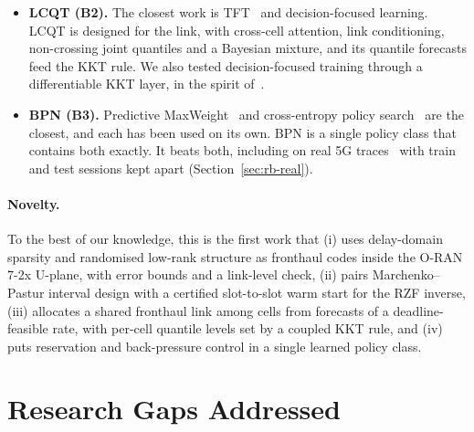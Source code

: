 \begin{itemize}
  \item \textbf{LCQT (B2).} The closest work is TFT~\cite{lim2021} and decision-focused learning. LCQT is designed for the link, with cross-cell attention, link conditioning, non-crossing joint quantiles and a Bayesian mixture, and its quantile forecasts feed the KKT rule. We also tested decision-focused training through a differentiable KKT layer, in the spirit of~\cite{donti2017,amos2017optnet}.
  \item \textbf{BPN (B3).} Predictive MaxWeight~\cite{tassiulas1992,huang2016} and cross-entropy policy search~\cite{rubinstein1999} are the closest, and each has been used on its own. BPN is a single policy class that contains both exactly. It beats both, including on real 5G traces~\cite{raca2020beyond} with train and test sessions kept apart (Section~\ref{sec:rb-real}).
\end{itemize}

\paragraph{Novelty.} To the best of our knowledge, this is the first work that (i) uses delay-domain sparsity and randomised low-rank structure as fronthaul codes inside the O-RAN 7-2x U-plane, with error bounds and a link-level check, (ii) pairs Marchenko--Pastur interval design with a certified slot-to-slot warm start for the RZF inverse, (iii) allocates a shared fronthaul link among cells from forecasts of a deadline-feasible rate, with per-cell quantile levels set by a coupled KKT rule, and (iv) puts reservation and back-pressure control in a single learned policy class.

\section{Research Gaps Addressed}
\label{sec:lit-gap}

